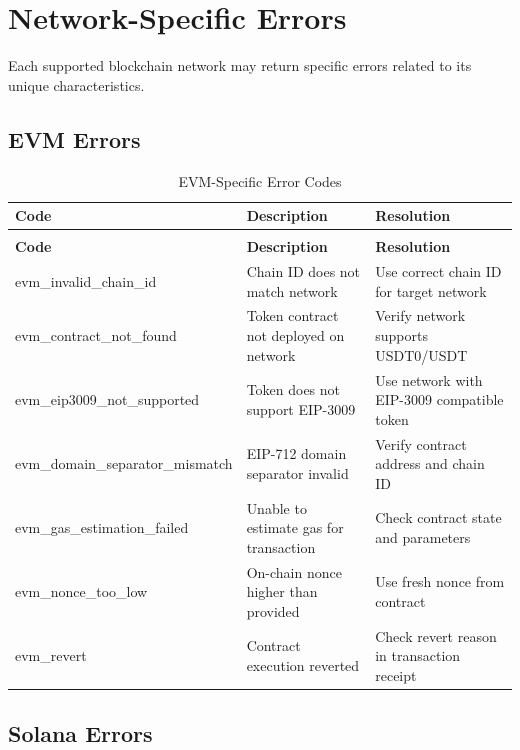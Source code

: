\section{Network-Specific Errors}

Each supported blockchain network may return specific errors related to its unique characteristics.

\subsection{EVM Errors}

\begin{longtable}{>{\ttfamily\footnotesize}l p{5cm} p{4cm}}
\caption{EVM-Specific Error Codes} \label{tab:evm-errors} \\
\toprule
\normalfont\textbf{Code} & \textbf{Description} & \textbf{Resolution} \\
\midrule
\endfirsthead
\multicolumn{3}{c}{\tablename\ \thetable\ -- continued} \\
\toprule
\normalfont\textbf{Code} & \textbf{Description} & \textbf{Resolution} \\
\midrule
\endhead
\midrule
\endfoot
\bottomrule
\endlastfoot
evm\_invalid\_chain\_id & Chain ID does not match network & Use correct chain ID for target network \\
evm\_contract\_not\_found & Token contract not deployed on network & Verify network supports USDT0/USDT \\
evm\_eip3009\_not\_supported & Token does not support EIP-3009 & Use network with EIP-3009 compatible token \\
evm\_domain\_separator\_mismatch & EIP-712 domain separator invalid & Verify contract address and chain ID \\
evm\_gas\_estimation\_failed & Unable to estimate gas for transaction & Check contract state and parameters \\
evm\_nonce\_too\_low & On-chain nonce higher than provided & Use fresh nonce from contract \\
evm\_revert & Contract execution reverted & Check revert reason in transaction receipt \\
\end{longtable}

\subsection{Solana Errors}


